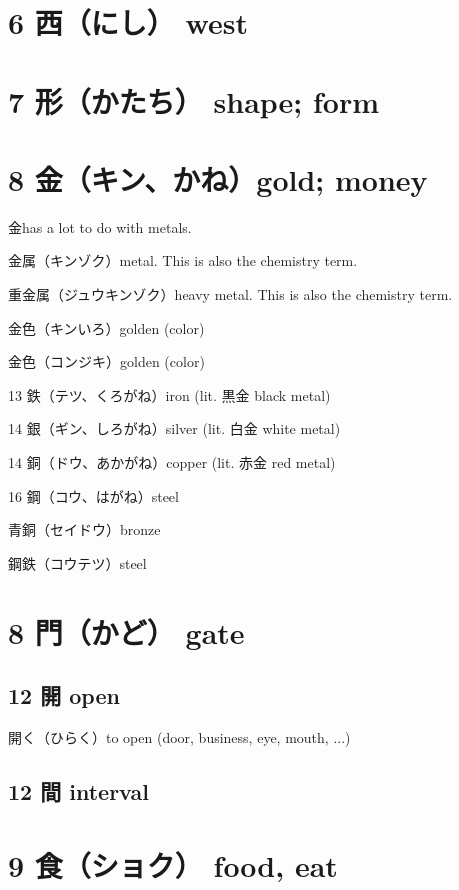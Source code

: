 \section{6 西（にし） west}

\section{7 形（かたち） shape; form}

\section{8 金（キン、かね）gold; money}

金has a lot to do with metals.

金属（キンゾク）metal. This is also the chemistry term.

重金属（ジュウキンゾク）heavy metal. This is also the chemistry term.

金色（キンいろ）golden (color)

金色（コンジキ）golden (color)

13 鉄（テツ、くろがね）iron (lit. 黒金 black metal)

14 銀（ギン、しろがね）silver (lit. 白金 white metal)

14 銅（ドウ、あかがね）copper (lit. 赤金 red metal)

16 鋼（コウ、はがね）steel

青銅（セイドウ）bronze

鋼鉄（コウテツ）steel

\section{8 門（かど） gate}

\subsection{12 開 open}

開く（ひらく）to open (door, business, eye, mouth, ...)

\subsection{12 間 interval}

\section{9 食（ショク） food, eat}

